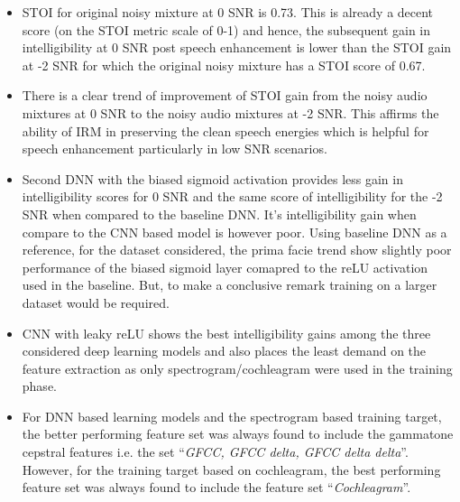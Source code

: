 \begin{itemize}
\item STOI for original noisy mixture at 0 SNR is 0.73. This is already a decent score (on the STOI metric scale of 0-1) and hence, the subsequent gain in intelligibility at 0 SNR post speech enhancement is lower than the STOI gain at -2 SNR for which the original noisy mixture has a STOI score of 0.67.
\item There is a clear trend of improvement of STOI gain from the noisy audio mixtures at 0 SNR to the noisy audio mixtures at -2 SNR. This affirms the ability of IRM in preserving the clean speech energies which is helpful for speech enhancement particularly in low SNR scenarios.
\item Second DNN with the biased sigmoid activation provides less gain in intelligibility scores for 0 SNR and the same score of intelligibility for the -2 SNR when compared to the baseline DNN. It's intelligibility gain when compare to the CNN based model is however poor. Using baseline DNN as a reference, for the dataset considered, the prima facie trend show slightly poor performance of the biased sigmoid layer comapred to the reLU activation used in the baseline. But, to make a conclusive remark training on a larger dataset would be required. 
\item CNN with leaky reLU shows the best intelligibility gains among the three considered deep learning models and also places the least demand on the feature extraction as only spectrogram/cochleagram were used in the training phase.
\item For DNN based learning models and the spectrogram based training target, the better performing feature set was always found to include the gammatone cepstral features i.e. the set \enquote{\textit{GFCC, GFCC delta, GFCC delta delta}}. However, for the training target based on cochleagram, the best performing feature set was always found to include the feature set  \enquote{\textit{Cochleagram}}.
\end{itemize}
